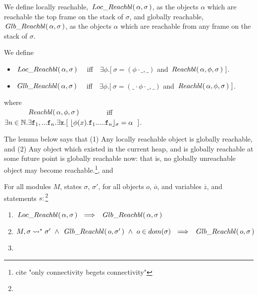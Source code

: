 We define  locally reachable, $ \,Loc\_Reachbl(\,\alpha,\sigma\,) $, as  the objects  $\alpha$ which are reachable the top frame on the stack of $\sigma$,
and globally reachable, $\,Glb\_Reachbl(\,\alpha,\sigma\,)$, as the objects  $\alpha$ which  are reachable from any  frame on the stack of $\sigma$.
 
\begin{definition} We define 
\begin{itemize}
\item
$ \,Loc\_Reachbl(\,\alpha,\sigma\,) $ \ \ iff\ \  
$\exists \phi.[\ \sigma=(\phi\cdot\_, \_)$ and $\Relevant \alpha \phi \sigma\ ]$. %
\item
$\,Glb\_Reachbl(\,\alpha,\sigma\,)$  \ \ iff\ \  
$\exists \phi.[\ \sigma=(\_\cdot\phi\cdot\_, \_)$ and $\Relevant \alpha \phi \sigma\ ]$. %
\end{itemize}
where\\
$\strut\ \ \ \  \ \ \ \ \ \ \,Reachbl(\,\alpha,\phi,\sigma\,) $  \ \ \ \ \ \ \ iff\ \  
$\exists n\in \mathbb{N}.\exists \prg{f}_1,... \prg{f}_n.\exists \prg{x}.[ \ \interpret{\sigma}{\phi(x).\prg{f}_1.....\prg{f}_n} = \alpha \ \ ]$.

\end{definition}


The lemma below says that (1) Any locally reachable object is globally reachable, and 
(2) Any object which existed in the current  heap, and is globally reachable at some future point is globally reachable now: that is, 
no globally unreachable object may become reachable.\footnote{cite "only connectivity begets connectivity"}, and



\begin{lemma}
\label{lemma:relevant}
For all modules $M$, states $\sigma$, $\sigma'$, for all objects $o$, ${\overline o}$, and  variables ${\overline z}$, and statements $s:$\footnote{}
\begin{enumerate}
\item
$ \LRelevant \alpha \sigma\ \ \Longrightarrow \ \   \GRelevant \alpha \sigma$
\item
$M, \sigma  \leadsto^*   {\sigma'} \ \wedge \  \GRelevant o {\sigma'} \ \wedge \ o\in dom(\sigma) \ \ \Longrightarrow \ \  \GRelevant o {\sigma}$
\item
\sdN{$\LRelevant {\overline o} {\sigma}
\ \ \wedge \  \LRelevant o {\Push {z} o {s} {\sigma}} \ \ \Longrightarrow \ \  \LRelevant o {\sigma}$
}
\end{enumerate}
\end{lemma}

